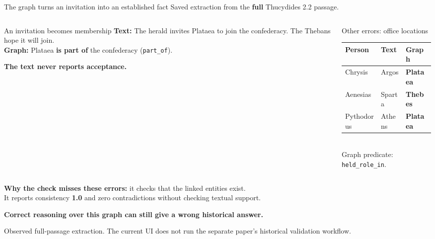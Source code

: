 \documentclass[aspectratio=169,10pt]{beamer}
\newcommand{\key}[1]{\textcolor{aegean}{\textbf{#1}}}
\newcommand{\hl}[1]{\textcolor{terracotta}{\textbf{#1}}}
\newcommand{\source}[1]{\vfill{\scriptsize\color{slate}#1\par}}
\newcommand{\question}[1]{\medskip\par\key{#1}\par}
\begin{document}
\begin{frame}{The graph turns an invitation into an established fact}
  \small Saved extraction from the \textbf{full} Thucydides 2.2 passage.
  \begin{columns}[T]
    \begin{column}{.56\textwidth}
      \begin{block}{An invitation becomes membership}
        \textbf{Text:} The herald invites Plataea to join the confederacy. The Thebans hope it will join.\\[6pt]
        \textbf{Graph:} Plataea \hl{is part of} the confederacy (\texttt{part\_of}).
      \end{block}
      \key{The text never reports acceptance.}
    \end{column}
    \begin{column}{.40\textwidth}
      \begin{block}{Other errors: office locations}
        \footnotesize
        \begin{tabular}{@{}lll@{}}
          \toprule
          \textbf{Person} & \textbf{Text} & \textbf{Graph}\\
          \midrule
          Chrysis & Argos & \hl{Plataea}\\[3pt]
          Aenesias & Sparta & \hl{Thebes}\\[3pt]
          Pythodorus & Athens & \hl{Plataea}\\
          \bottomrule
        \end{tabular}\\[4pt]
        Graph predicate: \texttt{held\_role\_in}.
      \end{block}
    \end{column}
  \end{columns}
  \medskip
  \textbf{Why the check misses these errors:} it checks that the linked entities exist.\\
  It reports consistency \textbf{1.0} and zero contradictions without checking textual support.
  \question{Correct reasoning over this graph can still give a wrong historical answer.}
  \source{Observed full-passage extraction. The current UI does not run the separate paper's historical validation workflow.}
\end{frame}
\end{document}
